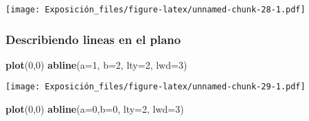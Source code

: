 \documentclass[]{article}
\newenvironment{Shaded}{\begin{snugshade}}{\end{snugshade}}
\newcommand{\DataTypeTok}[1]{\textcolor[rgb]{0.13,0.29,0.53}{#1}}
\newcommand{\DecValTok}[1]{\textcolor[rgb]{0.00,0.00,0.81}{#1}}
\newcommand{\KeywordTok}[1]{\textcolor[rgb]{0.13,0.29,0.53}{\textbf{#1}}}
\newcommand{\NormalTok}[1]{#1}
\newcommand{\OperatorTok}[1]{\textcolor[rgb]{0.81,0.36,0.00}{\textbf{#1}}}
\newcommand{\StringTok}[1]{\textcolor[rgb]{0.31,0.60,0.02}{#1}}
\begin{document}
\begin{Shaded}
\end{Shaded}

\texttt{[image: Exposición\_files/figure-latex/unnamed-chunk-28-1.pdf]}

\hypertarget{describiendo-lineas-en-el-plano}{%
\subsubsection{Describiendo lineas en el
plano}\label{describiendo-lineas-en-el-plano}}

\begin{Shaded}
\begin{Highlighting}[]
\KeywordTok{plot}\NormalTok{(}\DecValTok{0}\NormalTok{,}\DecValTok{0}\NormalTok{)}
\KeywordTok{abline}\NormalTok{(}\DataTypeTok{a=}\DecValTok{1}\NormalTok{, }\DataTypeTok{b=}\DecValTok{2}\NormalTok{, }\DataTypeTok{lty=}\DecValTok{2}\NormalTok{, }\DataTypeTok{lwd=}\DecValTok{3}\NormalTok{)}
\end{Highlighting}
\end{Shaded}

\texttt{[image: Exposición\_files/figure-latex/unnamed-chunk-29-1.pdf]}

\begin{Shaded}
\begin{Highlighting}[]
\KeywordTok{plot}\NormalTok{(}\DecValTok{0}\NormalTok{,}\DecValTok{0}\NormalTok{)}
\KeywordTok{abline}\NormalTok{(}\DataTypeTok{a=}\DecValTok{0}\NormalTok{,}\DataTypeTok{b=}\DecValTok{0}\NormalTok{, }\DataTypeTok{lty=}\DecValTok{2}\NormalTok{, }\DataTypeTok{lwd=}\DecValTok{3}\NormalTok{)}
\end{Highlighting}
\end{Shaded}
\end{document}
